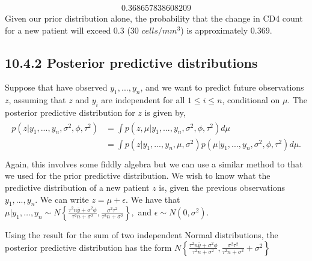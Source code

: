 \documentclass[letterpaper,10pt,english]{jupyterBook}
\begin{document}
\begin{sphinxVerbatim}[commandchars=\\\{\}]
  
\end{sphinxVerbatim}
\begin{equation*}
\begin{split}0.368657838608209\end{split}
\end{equation*}
\sphinxAtStartPar
Given our prior distribution alone, the probability that the change in CD4 count for a new patient will exceed 0.3 (30 \(cells/mm^3\)) is approximately 0.369.


\subsection{10.4.2 Posterior predictive distributions}
\label{\detokenize{10.e. Bayesian Statistics II:posterior-predictive-distributions}}
\sphinxAtStartPar
Suppose that have observed \(y_1, ..., y_n \), and we want to predict future observations \(z\), assuming that \(z\) and \(y_i\) are independent for all \(1 \leq i \leq n\), conditional on \(\mu\). The posterior predictive distribution for \(z\) is given by,
\begin{equation*}
\begin{split}
\begin{align*}
p(z| y_1, ..., y_n,  \sigma^2, \phi, \tau^2) &= \int p(z, \mu | y_1, ..., y_n,  \sigma^2, \phi, \tau^2) d \mu \\
     &= \int p(z | y_1, ..., y_n,\mu,  \sigma^2) p(\mu |y_1, ..., y_n,\sigma^2, \phi, \tau^2  ) d \mu. \\ 
     \end{align*}
\end{split}
\end{equation*}
\sphinxAtStartPar
Again, this involves some fiddly algebra but we can use a similar method to that we used for the prior predictive distribution. We wish to know what the predictive distribution of a new patient \(z\) is, given the previous observations \(y_1, ..., y_n\). We can write \(z  = \mu + \epsilon\). We have that \(\mu \vert y_1,\dots,y_n \sim N\left\{ \frac{ \tau^2 n\bar{y} + \sigma^2\phi }{\tau^2 n + \sigma^2}, \frac{\sigma^2\tau^2}{\tau^2n+\sigma^2} \right\}, \) and \(\epsilon \sim N(0, \sigma^2)\).

\sphinxAtStartPar
Using the result for the sum of two independent Normal distributions, the posterior predictive distribution has the form \( N\left\{ \frac{ \tau^2 n\bar{y} + \sigma^2\phi }{\tau^2 n + \sigma^2}, \frac{\sigma^2\tau^2}{\tau^2n+\sigma^2} + \sigma ^2\right\}\)
\end{document}
